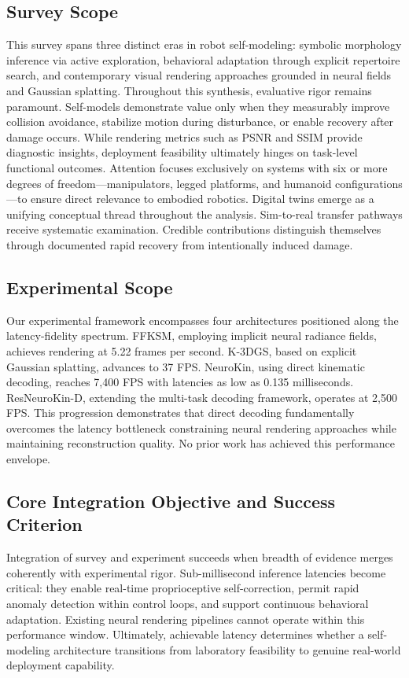 ﻿\documentclass[11pt,a4paper]{article}
\begin{document}
\subsection{Survey Scope}
This survey spans three distinct eras in robot self-modeling: symbolic morphology inference via active exploration, behavioral adaptation through explicit repertoire search, and contemporary visual rendering approaches grounded in neural fields and Gaussian splatting. Throughout this synthesis, evaluative rigor remains paramount. Self-models demonstrate value only when they measurably improve collision avoidance, stabilize motion during disturbance, or enable recovery after damage occurs. While rendering metrics such as PSNR and SSIM provide diagnostic insights, deployment feasibility ultimately hinges on task-level functional outcomes. Attention focuses exclusively on systems with six or more degrees of freedom—manipulators, legged platforms, and humanoid configurations—to ensure direct relevance to embodied robotics. Digital twins emerge as a unifying conceptual thread throughout the analysis. Sim-to-real transfer pathways receive systematic examination. Credible contributions distinguish themselves through documented rapid recovery from intentionally induced damage.

\subsection{Experimental Scope}
Our experimental framework encompasses four architectures positioned along the latency-fidelity spectrum. FFKSM, employing implicit neural radiance fields, achieves rendering at 5.22 frames per second. K-3DGS, based on explicit Gaussian splatting, advances to 37 FPS. NeuroKin, using direct kinematic decoding, reaches 7,400 FPS with latencies as low as 0.135 milliseconds. ResNeuroKin-D, extending the multi-task decoding framework, operates at 2,500 FPS. This progression demonstrates that direct decoding fundamentally overcomes the latency bottleneck constraining neural rendering approaches while maintaining reconstruction quality. No prior work has achieved this performance envelope.

\subsection{Core Integration Objective and Success Criterion}
Integration of survey and experiment succeeds when breadth of evidence merges coherently with experimental rigor. Sub-millisecond inference latencies become critical: they enable real-time proprioceptive self-correction, permit rapid anomaly detection within control loops, and support continuous behavioral adaptation. Existing neural rendering pipelines cannot operate within this performance window. Ultimately, achievable latency determines whether a self-modeling architecture transitions from laboratory feasibility to genuine real-world deployment capability.
\end{document}
